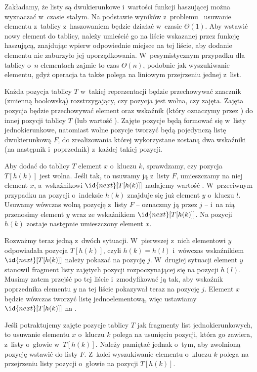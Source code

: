 \exercise %
Zakładamy, że listy są dwukierunkowe i~wartości funkcji haszującej można wyznaczać w~czasie stałym. Na podstawie wyników z~problemu~ usuwanie elementu z~tablicy z~haszowaniem będzie działać w~czasie $\Theta(1)$. Aby wstawić nowy element do tablicy, należy umieścić go na liście wskazanej przez funkcję haszującą, znajdując wpierw odpowiednie miejsce na tej liście, aby dodanie elementu nie zaburzyło jej uporządkowania. W~pesymistycznym przypadku dla tablicy o~$n$ elementach zajmie to czas $\Theta(n)$, podobnie jak wyszukiwanie elementu, gdyż operacja ta także polega na liniowym przejrzeniu jednej z~list.

\exercise %
Każda pozycja tablicy $T$ w~takiej reprezentacji będzie przechowywać znacznik (zmienną boolowską) rozstrzygający, czy pozycja jest wolna, czy zajęta. Zajęta pozycja będzie przechowywać element oraz wskaźnik (który oznaczymy przez ) do innej pozycji tablicy $T$ (lub wartość ). Zajęte pozycje będą formować się w~listy jednokierunkowe, natomiast wolne pozycje tworzyć będą pojedynczą listę dwukierunkową $F$, do zrealizowania której wykorzystane zostaną dwa wskaźniki (na następnik i~poprzednik) z~każdej takiej pozycji.

Aby dodać do tablicy $T$ element $x$ o~kluczu $k$, sprawdzamy, czy pozycja $T[h(k)]$ jest wolna. Jeśli tak, to usuwamy ją z~listy $F$, umieszczamy na niej element $x$, a~wskaźnikowi $\id{next}[T[h(k)]]$ nadajemy wartość . W~przeciwnym przypadku na pozycji o~indeksie $h(k)$ znajduje się już element $y$ o~kluczu $l$. Usuwamy wówczas wolną pozycję z~listy $F$ -- oznaczmy ją przez $j$ -- i~na nią przenosimy element $y$ wraz ze wskaźnikiem $\id{next}[T[h(k)]]$. Na pozycji $h(k)$ zostaje następnie umieszczony element $x$.

Rozważmy teraz jedną z~dwóch sytuacji. W~pierwszej z~nich elementowi $y$ odpowiadała pozycja $T[h(k)]$, czyli $h(k)=h(l)$ i~wówczas wskaźnikiem $\id{next}[T[h(k)]]$ należy pokazać na pozycję $j$. W~drugiej sytuacji element $y$ stanowił fragment listy zajętych pozycji rozpoczynającej się na pozycji $h(l)$. Musimy zatem przejść po tej liście i~zmodyfikować ją tak, aby wskaźnik  poprzednika elementu $y$ na tej liście pokazywał teraz na pozycję $j$. Element $x$ będzie wówczas tworzyć listę jednoelementową, więc ustawiamy $\id{next}[T[h(k)]]$ na .

Jeśli potraktujemy zajęte pozycje tablicy $T$ jak fragmenty list jednokierunkowych, to usuwanie elementu $x$ o~kluczu $k$ polega na usunięciu pozycji, która go zawiera, z~listy o~głowie w~$T[h(k)]$. Należy pamiętać jednak o~tym, aby zwolnioną pozycję wstawić do listy $F$. Z~kolei wyszukiwanie elementu o~kluczu $k$ polega na przejrzeniu listy pozycji o~głowie na pozycji $T[h(k)]$.

